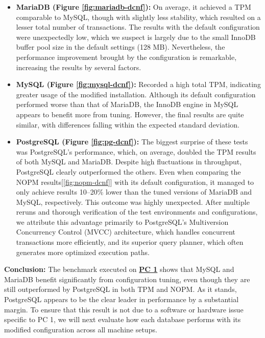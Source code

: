 \begin{itemize}
    \setlength\itemsep{0.1em}
    \item \textbf{MariaDB (Figure \ref{fig:mariadb-dcnf}):} On average, it achieved a TPM comparable to MySQL, though with slightly less stability, which resulted on a lesser total number of transactions. The results with the default configuration were unexpectedly low, which we suspect is largely due to the small InnoDB buffer pool size in the default settings (128 MB). Nevertheless, the performance improvement brought by the configuration is remarkable, increasing the results by several factors.
    \item \textbf{MySQL (Figure \ref{fig:mysql-dcnf}):} Recorded a high total TPM, indicating greater usage of the modified installation. Although its default configuration performed worse than that of MariaDB, the InnoDB engine in MySQL appears to benefit more from tuning. However, the final results are quite similar, with differences falling within the expected standard deviation.
    \newpage
    \item \textbf{PostgreSQL (Figure \ref{fig:pg-dcnf}):} The biggest surprise of these tests was PostgreSQL's performance, which, on average, doubled the TPM results of both MySQL and MariaDB. Despite high fluctuations in throughput, PostgreSQL clearly outperformed the others. Even when comparing the NOPM results[\ref{fig:nopm-dcnf}] with its default configuration, it managed to only achieve results 10–20\% lower than the tuned versions of MariaDB and MySQL, respectively. This outcome was highly unexpected. After multiple reruns and thorough verification of the test environments and configurations, we attribute this advantage primarily to PostgreSQL's Multiversion Concurrency Control (MVCC) architecture, which handles concurrent transactions more efficiently, and its superior query planner, which often generates more optimized execution paths. 
\end{itemize}

\textbf{Conclusion:} The benchmark executed on \textbf{\hyperref[tab:hardware-setup]{PC 1}} shows that MySQL and MariaDB benefit significantly from configuration tuning, even though they are still outperformed by PostgreSQL in both TPM and NOPM. As it stands, PostgreSQL appears to be the clear leader in performance by a substantial margin. To ensure that this result is not due to a software or hardware issue specific to PC 1, we will next evaluate how each database performs with its modified configuration across all machine setups.

